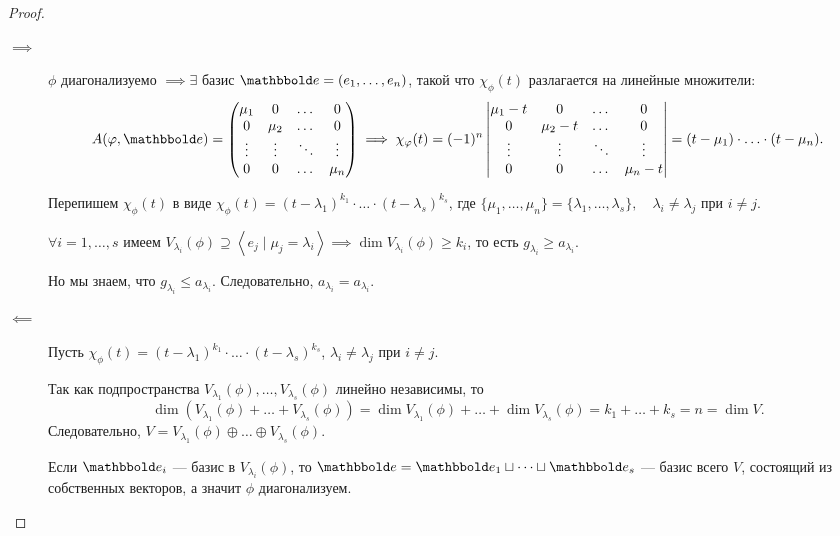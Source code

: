 \begin{proof}~
    \begin{description}
    \item[$\implies$] $\phi$ диагонализуемо $\implies \exists$ базис $\E = (e_1, \dots, e_n)$, такой что $\chi_\phi(t)$ разлагается на линейные множители:
        \begin{equation*}
            A(\phi, \E) = \begin{pmatrix} 
                \mu_1 & 0 & \dots & 0 \\
                0 & \mu_2 & \dots & 0 \\
                \vdots & \vdots & \ddots & \vdots \\
                0 & 0 & \dots & \mu_n
            \end{pmatrix} \implies \chi_\phi(t) = (-1)^n \begin{vmatrix} 
                \mu_1 - t & 0 & \dots & 0 \\
                0 & \mu_2 - t & \dots & 0 \\
                \vdots & \vdots & \ddots & \vdots \\
                0 & 0 & \dots & \mu_n - t
            \end{vmatrix} = (t - \mu_1) \cdot \ldots \cdot (t - \mu_n)
        .\end{equation*}

        Перепишем $\chi_\phi(t)$ в виде $\chi_\phi(t) = (t - \lambda_1)^{k_1} \cdot \ldots \cdot (t - \lambda_s)^{k_s}$, где $ \{\mu_1, \dots, \mu_n\} = \{\lambda_1, \dots, \lambda_s\}, \quad \lambda_i \neq \lambda_j$ при $i \neq j$.

        $\forall i = 1, \dots, s$ имеем $V_{\lambda_i}(\phi) \supseteq \left< e_j \mid \mu_j = \lambda_i \right> \implies \dim V_{\lambda_i}(\phi) \geq k_i$, то есть $g_{\lambda_i} \geq a_{\lambda_i}$.

        Но мы знаем, что $g_{\lambda_i} \leq a_{\lambda_i}$. Следовательно, $a_{\lambda_i} = a_{\lambda_i}$.
        \qedhere

    \item[$\impliedby$] Пусть $\chi_\phi(t) = (t - \lambda_1)^{k_1} \cdot \ldots \cdot (t - \lambda_s)^{k_s}$, $\lambda_i \neq \lambda_j$ при $i \neq j$.

        Так как подпространства $V_{\lambda_1}(\phi), \dots, V_{\lambda_s}(\phi)$ линейно независимы, то 
        \begin{equation*}
            \dim(V_{\lambda_1}(\phi) + \dots + V_{\lambda_s}(\phi)) = \dim V_{\lambda_1}(\phi) + \dots + \dim V_{\lambda_s}(\phi) = k_1 + \dots + k_s = n = \dim V
        .\end{equation*}
        Следовательно, $V = V_{\lambda_1}(\phi) \oplus \dots \oplus V_{\lambda_s}(\phi)$.

        Если $\E_i$ --- базис в $V_{\lambda_i}(\phi)$, то $\E = \E_1 \sqcup \dots \sqcup \E_s$ --- базис всего $V$, состоящий из собственных векторов, а значит $\phi$ диагонализуем.
    \end{description}
\end{proof}

